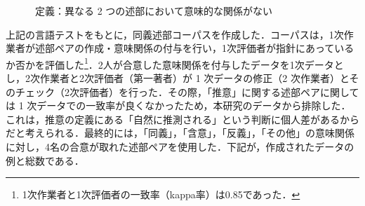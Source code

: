 \documentclass[japanese]{jnlp_1.4}
\begin{document}
　　　定義：異なる 2 つの述部において意味的な関係がない

上記の言語テストをもとに，同義述部コーパスを作成した．コーパスは，1次作業者が述部ペアの作成・意味関係の付与を行い，1次評価者が指針にあっているか否かを評価した\footnote{1次作業者と1次評価者の一致率（kappa率）は0.85であった．}．2人が合意した意味関係を付与したデータを1次データとし，2次作業者と2次評価者（第一著者）が 1 次データの修正（2 次作業者）とそのチェック（2次評価者）を行った．その際，「推意」に関する述部ペアに関しては 1 次データでの一致率が良くなかったため，本研究のデータから排除した．これは，推意の定義にある「自然に推測される」という判断に個人差があるからだと考えられる．最終的には，「同義」，「含意」，「反義」，「その他」の意味関係に対し，4名の合意が取れた述部ペアを使用した．下記が，作成されたデータの例と総数である．

\end{document}
